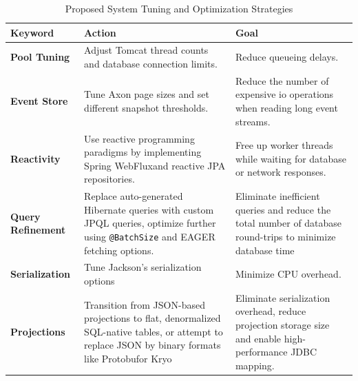\begin{table}[h!]
    \centering
    \small
    \begin{tabularx}{\linewidth}{lXX}
        \toprule
        \textbf{Keyword}          & \textbf{Action}                                                                                                                                                                    & \textbf{Goal}                                                                                               \\
        \midrule
        \textbf{Pool Tuning}      & Adjust Tomcat thread counts and database connection limits.                                                                                                                        & Reduce queueing delays.                                                                                     \\ \addlinespace
        \textbf{Event Store}      & Tune Axon page sizes and set different snapshot thresholds.                                                                                                                        & Reduce the number of expensive \gls{io} operations when reading long event streams.                         \\ \addlinespace
        \textbf{Reactivity}       & Use reactive programming paradigms by implementing Spring WebFlux\footnotemark[1] and reactive JPA repositories\footnotemark[2].                                                   & Free up worker threads while waiting for database or network responses.                                     \\ \addlinespace
        \textbf{Query Refinement} & Replace auto-generated Hibernate queries with custom JPQL queries, optimize further using \texttt{@BatchSize} and EAGER fetching options.                                          & Eliminate inefficient queries and reduce the total number of database round-trips to minimize database time \\ \addlinespace
        \textbf{Serialization}    & Tune Jackson's serialization options                                                                                                                                               & Minimize CPU overhead.                                                                                      \\ \addlinespace
        \textbf{Projections}      & Transition from JSON-based projections to flat, denormalized SQL-native tables, or attempt to replace JSON by binary formats like Protobuf\footnotemark[3] or Kryo\footnotemark[4] & Eliminate serialization overhead, reduce projection storage size and enable high-performance JDBC mapping.  \\
        \bottomrule
    \end{tabularx}
    \caption{Proposed System Tuning and Optimization Strategies}
    \label{tab:system-tuning}
\end{table}

